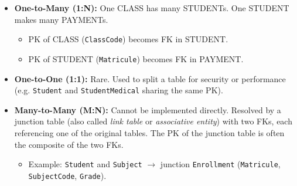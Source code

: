 \documentclass[11pt]{article}
\newcommand{\cle}[1]{{\popxbold\color{popdark}#1}}
\begin{document}
\begin{itemize}
    \item \textbf{One-to-Many (1:N):} One CLASS has many STUDENTs. One STUDENT makes many PAYMENTs.
        \begin{itemize}
            \item PK of CLASS (\texttt{ClassCode}) becomes FK in STUDENT.
            \item PK of STUDENT (\texttt{Matricule}) becomes FK in PAYMENT.
        \end{itemize}
    \item \textbf{One-to-One (1:1):} Rare. Used to split a table for security or performance (e.g. \texttt{Student} and \texttt{StudentMedical} sharing the same PK).
    \item \textbf{Many-to-Many (M:N):} Cannot be implemented directly. Resolved by a \cle{junction table} (also called \emph{link table} or \emph{associative entity}) with two FKs, each referencing one of the original tables. The PK of the junction table is often the composite of the two FKs.
        \begin{itemize}
            \item Example: \texttt{Student} and \texttt{Subject} $\to$ junction \texttt{Enrollment} (\texttt{Matricule}, \texttt{SubjectCode}, \texttt{Grade}).
        \end{itemize}
\end{itemize}
\end{document}
